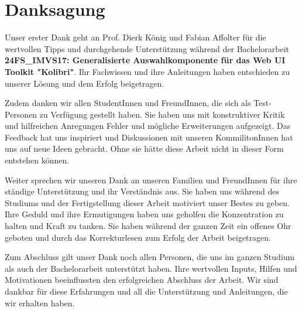 \chapter*{Danksagung}

Unser erster Dank geht an Prof. Dierk König und Fabian Affolter für die wertvollen Tipps und durchgehende Unterstützung 
während der Bachelorarbeit \textbf{24FS\_IMVS17: Generalisierte Auswahlkomponente für das Web UI Toolkit "Kolibri"}. 
Ihr Fachwissen und ihre Anleitungen haben entschieden zu unserer Lösung und dem Erfolg beigetragen.

Zudem danken wir allen StudentInnen und FreundInnen, die sich als Test-Personen zu Verfügung gestellt haben.
Sie haben uns mit konstruktiver Kritik und hilfreichen Anregungen Fehler und mögliche Erweiterungen aufgezeigt.
Das Feedback hat uns inspiriert und Diskussionen mit unseren KommilitonInnen hat uns auf neue Ideen gebracht.
Ohne sie hätte diese Arbeit nicht in dieser Form entstehen können.

Weiter sprechen wir unseren Dank an unseren Familien und FreundInnen für ihre ständige Unterstützung und ihr Verständnis aus.
Sie haben uns während des Studiums und der Fertigstellung dieser Arbeit motiviert unser Bestes zu geben. 
Ihre Geduld und ihre Ermutigungen haben uns geholfen die Konzentration zu halten und Kraft zu tanken.
Sie haben während der ganzen Zeit ein offenes Ohr geboten und durch das Korrekturlesen zum Erfolg der Arbeit beigetragen.

Zum Abschluss gilt unser Dank noch allen Personen, die uns im ganzen Studium als auch der Bachelorarbeit unterstützt haben.
Ihre wertvollen Inputs, Hilfen und Motivationen beeinflussten den erfolgreichen Abschluss der Arbeit.
Wir sind dankbar für diese Erfahrungen und all die Unterstützung und Anleitungen, die wir erhalten haben.
